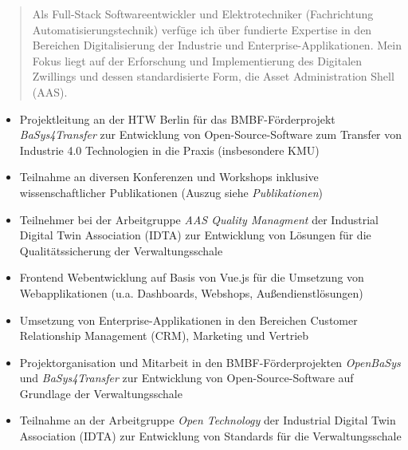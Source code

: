 \documentclass[10pt,a4paper,ragged2e,withhyper]{altacv}
\begin{document}
\begin{paracol}{2}
        \vspace{-6pt}
            \begin{quote}
                Als Full-Stack Softwareentwickler und Elektrotechniker (Fachrichtung Automatisierungstechnik) verfüge ich über fundierte Expertise in den Bereichen Digitalisierung der Industrie und Enterprise-Applikationen.
                Mein Fokus liegt auf der Erforschung und Implementierung des Digitalen Zwillings und dessen standardisierte Form, die Asset Administration Shell (AAS).
            \end{quote}
        
            \begin{itemize}
                \item Projektleitung an der HTW Berlin für das BMBF-Förderprojekt \textit{BaSys4Transfer} zur Entwicklung von Open-Source-Software zum Transfer von Industrie 4.0 Technologien in die Praxis (insbesondere KMU)
                \item Teilnahme an diversen Konferenzen und Workshops inklusive wissenschaftlicher Publikationen (Auszug siehe \textit{Publikationen})
                \item Teilnehmer bei der Arbeitgruppe \textit{AAS Quality Managment} der Industrial Digital Twin Association (IDTA) zur Entwicklung von Lösungen für die Qualitätssicherung der Verwaltungsschale
            \end{itemize}
            \divider

            \begin{itemize}
                \item Frontend Webentwicklung auf Basis von Vue.js für die Umsetzung von Webapplikationen (u.a. Dashboards, Webshops, Außendienstlösungen)
                \item Umsetzung von Enterprise-Applikationen in den Bereichen Customer Relationship Management (CRM), Marketing und Vertrieb
            \end{itemize}
            \divider

            \begin{itemize}
                \item Projektorganisation und Mitarbeit in den BMBF-Förderprojekten \textit{OpenBaSys}\\ und \textit{BaSys4Transfer} zur Entwicklung von Open-Source-Software auf Grundlage der Verwaltungsschale
                \item Teilnahme an der Arbeitgruppe \textit{Open Technology} der Industrial Digital Twin Association (IDTA) zur Entwicklung von Standards für die Verwaltungsschale
            \end{itemize}
            \divider


\end{paracol}
\end{document}
